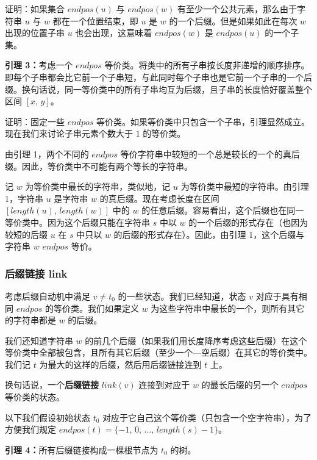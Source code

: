证明：如果集合 $endpos(u)$ 与 $endpos(w)$ 有至少一个公共元素，那么由于字符串 $u$ 与 $w$ 都在一个位置结束，即 $u$ 是 $w$ 的一个后缀。但是如果如此在每次 $w$ 出现的位置子串 $u$ 也会出现，这意味着 $endpos(w)$ 是 $endpos(u)$ 的一个子集。

\begin{QUOTE}{}{}
\textbf{引理 3：}考虑一个 $endpos$ 等价类。将类中的所有子串按长度非递增的顺序排序。即每个子串都会比它前一个子串短，与此同时每个子串也是它前一个子串的一个后缀。换句话说，同一等价类中的所有子串均互为后缀，且子串的长度恰好覆盖整个区间 $[x,\,y]$。
\end{QUOTE}

证明：固定一些 $endpos$ 等价类。如果等价类中只包含一个子串，引理显然成立。现在我们来讨论子串元素个数大于 $1$ 的等价类。

由引理 1，两个不同的 $endpos$ 等价字符串中较短的一个总是较长的一个的真后缀。因此，等价类中不可能有两个等长的字符串。

记 $w$ 为等价类中最长的字符串，类似地，记 $u$ 为等价类中最短的字符串。由引理 1，字符串 $u$ 是字符串 $w$ 的真后缀。现在考虑长度在区间 $[length(u),\,length(w)]$ 中的 $w$ 的任意后缀。容易看出，这个后缀也在同一等价类中。因为这个后缀只能在字符串 $s$ 中以 $w$ 的一个后缀的形式存在（也因为较短的后缀 $u$ 在 $s$ 中只以 $w$ 的后缀的形式存在）。因此，由引理 1，这个后缀与字符串 $w$ $endpos$ 等价。

\subsubsection{后缀链接 link}

考虑后缀自动机中满足 $v\ne t_0$ 的一些状态。我们已经知道，状态 $v$ 对应于具有相同 $endpos$ 的等价类。我们如果定义 $w$ 为这些字符串中最长的一个，则所有其它的字符串都是 $w$ 的后缀。

我们还知道字符串 $w$ 的前几个后缀（如果我们用长度降序考虑这些后缀）在这个等价类中全部被包含，且所有其它后缀（至少一个—空后缀）在其它的等价类中。我们记 $t$ 为最大的这样的后缀，然后用后缀链接连到 $t$ 上。

换句话说，一个\textbf{后缀链接} $link(v)$ 连接到对应于 $w$ 的最长后缀的另一个 $endpos$ 等价类的状态。

以下我们假设初始状态 $t_0$ 对应于它自己这个等价类（只包含一个空字符串），为了方便我们规定 $endpos(t)=\{-1,\,0,\,\ldots,\,length(s)-1\}$。

\begin{QUOTE}{}{}
\textbf{引理 4：}所有后缀链接构成一棵根节点为 $t_0$ 的树。
\end{QUOTE}

